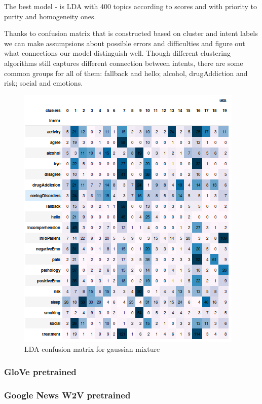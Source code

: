 \documentclass[11pt]{article}
\begin{document}
The best model - is LDA with 400 topics according to scores and with priority to purity and homogeneity ones.

Thanks to confusion matrix that is constructed based on cluster and intent labels we can make assumpsions about possible errors and difficulties and figure out what connections our model distinguish well. Though different clustering algorithms still captures different connection between intents, there are some common groups for all of them: fallback and hello; alcohol, drugAddiction and risk; social and emotions.


\begin{figure}[h]
	\centering
	\includegraphics[scale=0.7]{lda_gm_cm.png}
	\caption{LDA confusion matrix for gaussian mixture}
\label{lda_gm_cm}
\end{figure}
\FloatBarrier



\subsubsection{GloVe pretrained}

\subsubsection{Google News W2V pretrained}
\end{document}
